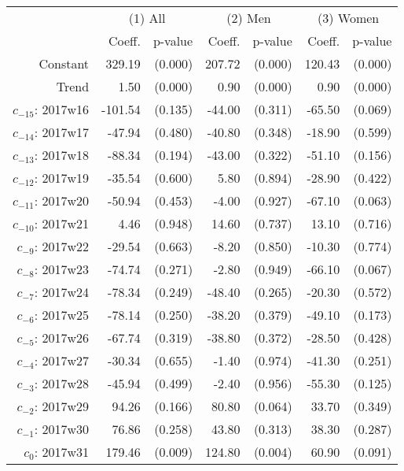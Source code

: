 \begin{threeparttable}
\begin{tabular}{@{}r|rr|rr|rr@{}} \hline\hline
 & \multicolumn{2}{c|}{(1) All} & \multicolumn{2}{c|}{(2) Men} &  \multicolumn{2}{c}{(3) Women} \\ 
 & Coeff. & p-value  & Coeff. & p-value & Coeff. & p-value \\ \hline
 Constant & 329.19  & (0.000) & 207.72  & (0.000)  & 120.43  & (0.000) \\ 
 Trend &  1.50  & (0.000) &  0.90  & (0.000)  &  0.90  & (0.000) \\ 
 $ c_{-15} $: 2017w16 & -101.54  & (0.135) & -44.00  & (0.311)  & -65.50  & (0.069) \\ 
 $ c_{-14} $: 2017w17 & -47.94  & (0.480) & -40.80  & (0.348)  & -18.90  & (0.599) \\ 
 $ c_{-13} $: 2017w18 & -88.34  & (0.194) & -43.00  & (0.322)  & -51.10  & (0.156) \\ 
 $ c_{-12} $: 2017w19 & -35.54  & (0.600) &  5.80  & (0.894)  & -28.90  & (0.422) \\ 
 $ c_{-11} $: 2017w20 & -50.94  & (0.453) & -4.00  & (0.927)  & -67.10  & (0.063) \\ 
 $ c_{-10} $: 2017w21 &  4.46  & (0.948) & 14.60  & (0.737)  & 13.10  & (0.716) \\ 
 $ c_{-9} $: 2017w22 & -29.54  & (0.663) & -8.20  & (0.850)  & -10.30  & (0.774) \\ 
 $ c_{-8} $: 2017w23 & -74.74  & (0.271) & -2.80  & (0.949)  & -66.10  & (0.067) \\ 
 $ c_{-7} $: 2017w24 & -78.34  & (0.249) & -48.40  & (0.265)  & -20.30  & (0.572) \\ 
 $ c_{-6} $: 2017w25 & -78.14  & (0.250) & -38.20  & (0.379)  & -49.10  & (0.173) \\ 
 $ c_{-5} $: 2017w26 & -67.74  & (0.319) & -38.80  & (0.372)  & -28.50  & (0.428) \\ 
 $ c_{-4} $: 2017w27 & -30.34  & (0.655) & -1.40  & (0.974)  & -41.30  & (0.251) \\ 
 $ c_{-3} $: 2017w28 & -45.94  & (0.499) & -2.40  & (0.956)  & -55.30  & (0.125) \\ 
 $ c_{-2} $: 2017w29 & 94.26  & (0.166) & 80.80  & (0.064)  & 33.70  & (0.349) \\ 
 $ c_{-1} $: 2017w30 & 76.86  & (0.258) & 43.80  & (0.313)  & 38.30  & (0.287) \\ 
 $ c_{0} $: 2017w31 & 179.46  & (0.009) & 124.80  & (0.004)  & 60.90  & (0.091) \\ 

\end{tabular}
\end{threeparttable}
